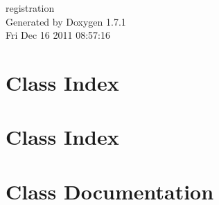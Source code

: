 \documentclass[a4paper]{book}
\begin{document}
\hypersetup{pageanchor=false}
\begin{titlepage}
\vspace*{7cm}
\begin{center}
{\Large registration }\\
\vspace*{1cm}
{\large Generated by Doxygen 1.7.1}\\
\vspace*{0.5cm}
{\small Fri Dec 16 2011 08:57:16}\\
\end{center}
\end{titlepage}
\clearemptydoublepage
{}
\tableofcontents
\clearemptydoublepage
{}
\hypersetup{pageanchor=true}
\chapter{Class Index}

\chapter{Class Index}

\chapter{Class Documentation}










































\printindex
\end{document}
